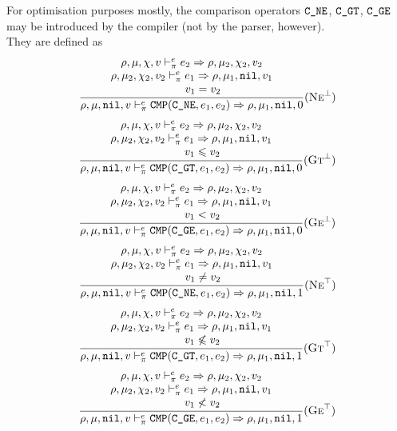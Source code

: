 For optimisation purposes mostly, the comparison operators \(\texttt{C\_NE}\), \(\texttt{C\_GT}\), \(\texttt{C\_GE}\) may be introduced by the compiler (not by the parser, however).\\
They are defined as
\[\dfrac{\begin{array}{c}
    \rho,\mu,\chi,v \vdash_\pi^e e_2\Rightarrow \rho,\mu_2,\chi_2,v_2 \\
    \rho,\mu_2,\chi_2,v_2 \vdash_\pi^e e_1\Rightarrow \rho,\mu_1,\texttt{nil},v_1 \\
    \qquad v_1 = v_2
\end{array}}{\rho,\mu,\texttt{nil},v \vdash_\pi^e \texttt{CMP}(\texttt{C\_NE}, e_1, e_2) \Rightarrow \rho,\mu_1,\texttt{nil},0}(\textsc{Ne}^\bot)\]
\[\dfrac{\begin{array}{c}
    \rho,\mu,\chi,v \vdash_\pi^e e_2\Rightarrow \rho,\mu_2,\chi_2,v_2 \\
    \rho,\mu_2,\chi_2,v_2 \vdash_\pi^e e_1\Rightarrow \rho,\mu_1,\texttt{nil},v_1 \\
    \qquad v_1 \leqslant v_2
\end{array}}{\rho,\mu,\texttt{nil},v \vdash_\pi^e \texttt{CMP}(\texttt{C\_GT}, e_1, e_2) \Rightarrow \rho,\mu_1,\texttt{nil},0}(\textsc{Gt}^\bot)\]
\[\dfrac{\begin{array}{c}
    \rho,\mu,\chi,v \vdash_\pi^e e_2\Rightarrow \rho,\mu_2,\chi_2,v_2 \\
    \rho,\mu_2,\chi_2,v_2 \vdash_\pi^e e_1\Rightarrow \rho,\mu_1,\texttt{nil},v_1 \\
    \qquad v_1 < v_2
\end{array}}{\rho,\mu,\texttt{nil},v \vdash_\pi^e \texttt{CMP}(\texttt{C\_GE}, e_1, e_2) \Rightarrow \rho,\mu_1,\texttt{nil},0}(\textsc{Ge}^\bot)\]
\[\dfrac{\begin{array}{c}
    \rho,\mu,\chi,v \vdash_\pi^e e_2\Rightarrow \rho,\mu_2,\chi_2,v_2 \\
    \rho,\mu_2,\chi_2,v_2 \vdash_\pi^e e_1\Rightarrow \rho,\mu_1,\texttt{nil},v_1 \\
    \qquad v_1 \ne v_2
\end{array}}{\rho,\mu,\texttt{nil},v \vdash_\pi^e \texttt{CMP}(\texttt{C\_NE}, e_1, e_2) \Rightarrow \rho,\mu_1,\texttt{nil},1}(\textsc{Ne}^\top)\]
\[\dfrac{\begin{array}{c}
    \rho,\mu,\chi,v \vdash_\pi^e e_2\Rightarrow \rho,\mu_2,\chi_2,v_2 \\
    \rho,\mu_2,\chi_2,v_2 \vdash_\pi^e e_1\Rightarrow \rho,\mu_1,\texttt{nil},v_1 \\
    \qquad v_1 \not\leqslant v_2
\end{array}}{\rho,\mu,\texttt{nil},v \vdash_\pi^e \texttt{CMP}(\texttt{C\_GT}, e_1, e_2) \Rightarrow \rho,\mu_1,\texttt{nil},1}(\textsc{Gt}^\top)\]
\[\dfrac{\begin{array}{c}
    \rho,\mu,\chi,v \vdash_\pi^e e_2\Rightarrow \rho,\mu_2,\chi_2,v_2 \\
    \rho,\mu_2,\chi_2,v_2 \vdash_\pi^e e_1\Rightarrow \rho,\mu_1,\texttt{nil},v_1 \\
    \qquad v_1 \not< v_2
\end{array}}{\rho,\mu,\texttt{nil},v \vdash_\pi^e \texttt{CMP}(\texttt{C\_GE}, e_1, e_2) \Rightarrow \rho,\mu_1,\texttt{nil},1}(\textsc{Ge}^\top)\]

